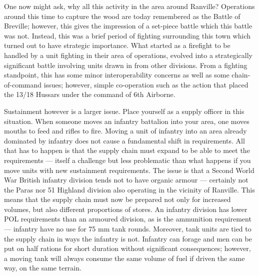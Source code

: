\documentclass[noraggedright]{turabian-researchpaper}
\begin{document}

One now might ask, why all this activity in the area around Ranville?  
Operations around this time to capture the wood are today remembered as the
Battle of Breville; however, this gives the impression of a set-piece battle
which this battle was not.  Instead, this was a brief period of fighting
surrounding this town which turned out to have strategic importance.  What 
started as a firefight to be handled by a unit fighting in their area of 
operations, evolved into a strategically significant battle involving units
drawn in from other divisions.  From a fighting standpoint, this has some 
minor interoperability concerns as well as some chain-of-command issues; 
however, simple co-operation such as the action that placed the 13/18
Hussars under the command of 6th Airborne.  

Sustainment however is a larger issue.  Place yourself as a supply officer in
this situation.  When someone moves an infantry battalion into your area,
one moves mouths to feed and rifles to fire.  Moving a unit of infantry into
an area already dominated by infantry does not cause a fundamental shift in
requirements.  All that has to happen is that the supply chain must expand to
be able to meet the requirements --- itself a challenge but less problematic
than what happens if you move units with new sustainment requirements. The 
issue is that a Second World War British infantry division tends not to have
organic armour --- certainly not the Paras nor 51 Highland division also
operating in the vicinity of Ranville.  This means that the supply chain 
must now be prepared not only for increased volumes, but also different 
proportions of stores.  An infantry division has lower POL requirements than
an armoured division, as is the ammunition requirement --- infantry have no
use for 75 mm tank rounds.  Moreover, tank units are tied to the supply chain
in ways the infantry is not.  Infantry can forage and men can be put on half
rations for short duration without significant consequences; however, a 
moving tank will always consume the same volume of fuel if driven the same
way, on the same terrain.  
\end{document}
